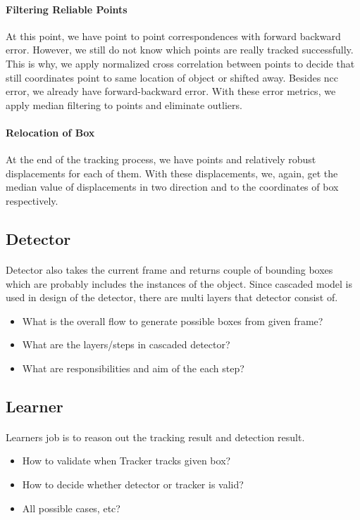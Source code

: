 \documentclass{article}
\begin{document}
            \paragraph{Filtering Reliable Points}
                At this point, we have point to point correspondences with forward backward error. However, we still do not know which points
                are really tracked successfully. This is why, we apply normalized cross correlation between points to decide that
                still coordinates point to same location of object or shifted away. Besides ncc error, we already have forward-backward error.
                With these error metrics, we apply median filtering to points and eliminate outliers.
            \paragraph{Relocation of Box}
                At the end of the tracking process, we have points and relatively robust displacements for each of them.
                With these displacements, we, again, get the median value of displacements in two direction and
                to the coordinates of box respectively.
        \subsection{Detector}
            \paragraph{}
                Detector also takes the current frame and returns couple of bounding boxes
                which are probably includes the instances of the object. Since cascaded model is used in
                design of the detector, there are multi layers that detector consist of.
                \begin{itemize}
                    \item What is the overall flow to generate possible boxes from given frame?
                    \item What are the layers/steps in cascaded detector?
                    \item What are responsibilities and aim of the each step?
                \end{itemize}
        \subsection{Learner}
            \paragraph{}
                Learners job is to reason out the tracking result and detection result.
                \begin{itemize}
                    \item How to validate when Tracker tracks given box?
                    \item How to decide whether detector or tracker is valid?
                    \item All possible cases, etc?
                \end{itemize}
\end{document}
